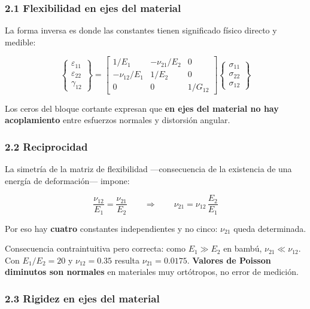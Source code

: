 \documentclass[11pt,letterpaper,oneside]{report}
\begin{document}
\subsubsection{2.1 Flexibilidad en ejes del material}

La forma inversa es donde las constantes tienen significado físico directo y medible:

\[
\begin{Bmatrix} \varepsilon_{11} \\ \varepsilon_{22} \\ \gamma_{12} \end{Bmatrix}
=
\begin{bmatrix}
1/E_1 & -\nu_{21}/E_2 & 0 \\
-\nu_{12}/E_1 & 1/E_2 & 0 \\
0 & 0 & 1/G_{12}
\end{bmatrix}
\begin{Bmatrix} \sigma_{11} \\ \sigma_{22} \\ \sigma_{12} \end{Bmatrix}
\]

Los ceros del bloque cortante expresan que \textbf{en ejes del material no hay acoplamiento} entre esfuerzos normales y distorsión angular.

\subsubsection{2.2 Reciprocidad}

La simetría de la matriz de flexibilidad ---consecuencia de la existencia de una energía de deformación--- impone:

\[
\boxed{\dfrac{\nu_{12}}{E_1} = \dfrac{\nu_{21}}{E_2}} \qquad\Longrightarrow\qquad \nu_{21} = \nu_{12}\,\frac{E_2}{E_1}
\]

Por eso hay \textbf{cuatro} constantes independientes y no cinco: $\nu_{21}$ queda determinada.

Consecuencia contraintuitiva pero correcta: como $E_1 \gg E_2$ en bambú, $\nu_{21} \ll \nu_{12}$. Con $E_1/E_2 = 20$ y $\nu_{12} = 0.35$ resulta $\nu_{21} = 0.0175$. \textbf{Valores de Poisson diminutos son normales} en materiales muy ortótropos, no error de medición.

\subsubsection{2.3 Rigidez en ejes del material}
\end{document}

